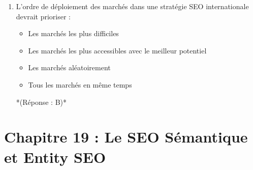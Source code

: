 \documentclass[12pt,a4paper,twoside]{report}
\begin{document}
\begin{enumerate}
\item L'ordre de déploiement des marchés dans une stratégie SEO internationale devrait prioriser :
\begin{itemize}
\item[A)] Les marchés les plus difficiles
\item[B)] Les marchés les plus accessibles avec le meilleur potentiel
\item[C)] Les marchés aléatoirement
\item[D)] Tous les marchés en même temps
\end{itemize}
*(Réponse : B)*
\end{enumerate}

\section*{Chapitre 19 : Le SEO Sémantique et Entity SEO}
\end{document}
